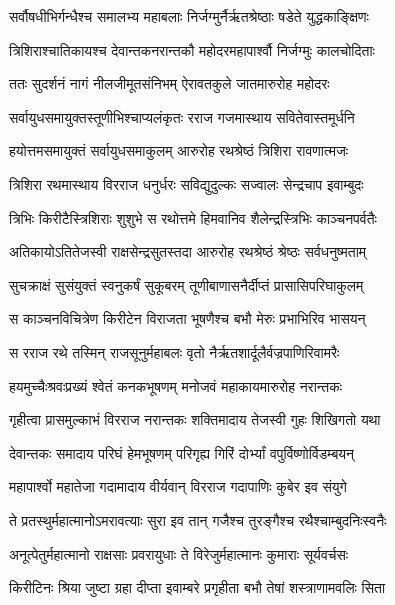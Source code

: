 \twolineshloka
{सर्वौषधीभिर्गन्धैश्च समालभ्य महाबलाः}
{निर्जग्मुर्नैर्ऋतश्रेष्ठाः षडेते युद्धकाङ्क्षिणः} %

\twolineshloka
{त्रिशिराश्चातिकायश्च देवान्तकनरान्तकौ}
{महोदरमहापार्श्वौ निर्जग्मुः कालचोदिताः} %

\twolineshloka
{ततः सुदर्शनं नागं नीलजीमूतसंनिभम्}
{ऐरावतकुले जातमारुरोह महोदरः} %

\twolineshloka
{सर्वायुधसमायुक्तस्तूणीभिश्चाप्यलंकृतः}
{रराज गजमास्थाय सवितेवास्तमूर्धनि} %

\twolineshloka
{हयोत्तमसमायुक्तं सर्वायुधसमाकुलम्}
{आरुरोह रथश्रेष्ठं त्रिशिरा रावणात्मजः} %

\twolineshloka
{त्रिशिरा रथमास्थाय विरराज धनुर्धरः}
{सविद्युदुल्कः सज्वालः सेन्द्रचाप इवाम्बुदः} %

\twolineshloka
{त्रिभिः किरीटैस्त्रिशिराः शुशुभे स रथोत्तमे}
{हिमवानिव शैलेन्द्रस्त्रिभिः काञ्चनपर्वतैः} %

\twolineshloka
{अतिकायोऽतितेजस्वी राक्षसेन्द्रसुतस्तदा}
{आरुरोह रथश्रेष्ठं श्रेष्ठः सर्वधनुष्मताम्} %

\twolineshloka
{सुचक्राक्षं सुसंयुक्तं स्वनुकर्षं सुकूबरम्}
{तूणीबाणासनैर्दीप्तं प्रासासिपरिघाकुलम्} %

\twolineshloka
{स काञ्चनविचित्रेण किरीटेन विराजता}
{भूषणैश्च बभौ मेरुः प्रभाभिरिव भासयन्} %

\twolineshloka
{स रराज रथे तस्मिन् राजसूनुर्महाबलः}
{वृतो नैर्ऋतशार्दूलैर्वज्रपाणिरिवामरैः} %

\twolineshloka
{हयमुच्चैःश्रवःप्रख्यं श्वेतं कनकभूषणम्}
{मनोजवं महाकायमारुरोह नरान्तकः} %

\twolineshloka
{गृहीत्वा प्रासमुल्काभं विरराज नरान्तकः}
{शक्तिमादाय तेजस्वी गुहः शिखिगतो यथा} %

\twolineshloka
{देवान्तकः समादाय परिघं हेमभूषणम्}
{परिगृह्य गिरिं दोर्भ्यां वपुर्विष्णोर्विडम्बयन्} %

\twolineshloka
{महापार्श्वो महातेजा गदामादाय वीर्यवान्}
{विरराज गदापाणिः कुबेर इव संयुगे} %

\twolineshloka
{ते प्रतस्थुर्महात्मानोऽमरावत्याः सुरा इव}
{तान् गजैश्च तुरङ्गैश्च रथैश्चाम्बुदनिःस्वनैः} %

\twolineshloka
{अनूत्पेतुर्महात्मानो राक्षसाः प्रवरायुधाः}
{ते विरेजुर्महात्मानः कुमाराः सूर्यवर्चसः} %

\twolineshloka
{किरीटिनः श्रिया जुष्टा ग्रहा दीप्ता इवाम्बरे}
{प्रगृहीता बभौ तेषां शस्त्राणामवलिः सिता} %

